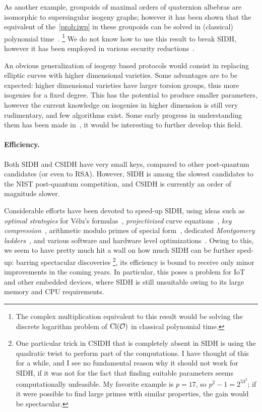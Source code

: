 \documentclass{report}
\theoremstyle{plain}
\theoremstyle{definition}
\begin{document}
As another example, groupoids of maximal orders of quaternion albebras
are isomorphic to supersingular isogeny graphs; however it has been
shown that the equivalent of the~\ref{prob:iwp} in these groupoids can
be solved in (classical) polynomial time~\cite{kohel2014quaternion}.%
\footnote{The complex multiplication equivalent to this result would
  be solving the discrete logarithm problem of $\operatorname{Cl}(\mathcal{O})$ in classical
  polynomial time.} %
We do not know how to use this result to break SIDH, however it has
been employed in various security
reductions~\cite{galbraithsecurity,cryptoeprint:2017:962}.

An obvious generalization of isogeny based protocols would consist in
replacing elliptic curves with higher dimensional varieties. %
Some advantages are to be expected: higher dimensional varieties have
larger torsion groups, thus more isogenies for a fixed degree. %
This has the potential to produce smaller parameters, however the
current knowledge on isogenies in higher dimension is still very
rudimentary, and few algorithms exist. %
Some early progress in understanding them has been made
in~\cite{lubicz_robert_2012,lubicz_robert_2015,cosset2015computing,ionica2014isogeny,Brooks2017},
it would be interesting to further develop this field. %

\paragraph{Efficiency.}
Both SIDH and CSIDH have very small keys, compared to other
post-quantum candidates (or even to RSA). %
However, SIDH is among the slowest candidates to the NIST post-quantum
competition, and CSIDH is currently an order of magnitude slower. %

Considerable efforts have been devoted to speed-up SIDH, using ideas
such as \emph{optimal strategies} for Vélu's
formulas~\cite{defeo+jao+plut12}, \emph{projectivized} curve
equations~\cite{costello2016sidh}, \emph{key
  compression}~\cite{azarderakhsh2016key,Costello2017,10.1007/978-3-319-79063-3_12},
arithmetic modulo primes of special
form~\cite{costello2016sidh,vercauteren-sidh-fp,8023082}, dedicated
\emph{Montgomery ladders}~\cite{flor_sidh_x64}, and various software
and hardware level optimizations~\cite{cryptoeprint:2017:1213}. %
Owing to this, we seem to have pretty much hit a wall on how much SIDH
can be further sped-up: barring spectacular discoveries%
\footnote{One particular trick in CSIDH that is completely absent in
  SIDH is using the quadratic twist to perform part of the
  computations. %
  I have thought of this for a while, and I see no fundamental reason
  why it should not work for SIDH, if it was not for the fact that
  finding suitable parameters seems computationally unfeasible. %
  My favorite example is $p=17$, so $p^2-1=2^53^2$; if it were
  possible to find large primes with similar properties, the gain
  would be spectacular.}, %
its efficiency is bound to receive only minor improvements in the
coming years. %
In particular, this poses a problem for IoT and other embedded
devices, where SIDH is still unsuitable owing to its large memory and
CPU requirements. %
\end{document}
